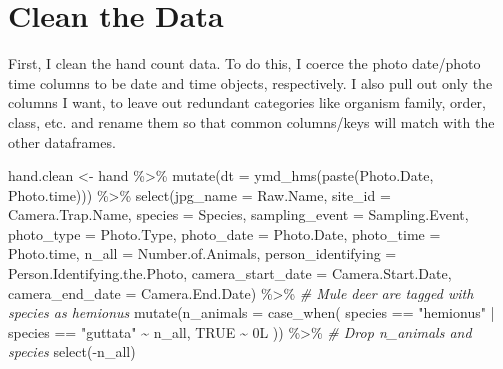 \documentclass[
]{book}
\newenvironment{Shaded}{\begin{snugshade}}{\end{snugshade}}
\newcommand{\AttributeTok}[1]{\textcolor[rgb]{0.77,0.63,0.00}{#1}}
\newcommand{\CommentTok}[1]{\textcolor[rgb]{0.56,0.35,0.01}{\textit{#1}}}
\newcommand{\ConstantTok}[1]{\textcolor[rgb]{0.00,0.00,0.00}{#1}}
\newcommand{\FunctionTok}[1]{\textcolor[rgb]{0.00,0.00,0.00}{#1}}
\newcommand{\NormalTok}[1]{#1}
\newcommand{\OtherTok}[1]{\textcolor[rgb]{0.56,0.35,0.01}{#1}}
\newcommand{\SpecialCharTok}[1]{\textcolor[rgb]{0.00,0.00,0.00}{#1}}
\newcommand{\StringTok}[1]{\textcolor[rgb]{0.31,0.60,0.02}{#1}}
\begin{document}
\hypertarget{clean-the-data}{%
\section{Clean the Data}\label{clean-the-data}}

First, I clean the hand count data. To do this, I coerce the photo date/photo time columns to be date and time objects, respectively. I also pull out only the columns I want, to leave out redundant categories like organism family, order, class, etc. and rename them so that common columns/keys will match with the other dataframes.

\begin{Shaded}
\begin{Highlighting}[]
\NormalTok{hand.clean }\OtherTok{\textless{}{-}}\NormalTok{ hand }\SpecialCharTok{\%\textgreater{}\%} 
  \FunctionTok{mutate}\NormalTok{(}\AttributeTok{dt =} \FunctionTok{ymd\_hms}\NormalTok{(}\FunctionTok{paste}\NormalTok{(Photo.Date, Photo.time))) }\SpecialCharTok{\%\textgreater{}\%} 
  \FunctionTok{select}\NormalTok{(}\AttributeTok{jpg\_name =}\NormalTok{ Raw.Name,}
         \AttributeTok{site\_id =}\NormalTok{ Camera.Trap.Name,}
         \AttributeTok{species =}\NormalTok{ Species,}
         \AttributeTok{sampling\_event =}\NormalTok{ Sampling.Event,}
         \AttributeTok{photo\_type =}\NormalTok{ Photo.Type,}
         \AttributeTok{photo\_date =}\NormalTok{ Photo.Date,}
         \AttributeTok{photo\_time =}\NormalTok{ Photo.time,}
         \AttributeTok{n\_all =}\NormalTok{ Number.of.Animals,}
         \AttributeTok{person\_identifying =}\NormalTok{ Person.Identifying.the.Photo,}
         \AttributeTok{camera\_start\_date =}\NormalTok{ Camera.Start.Date,}
         \AttributeTok{camera\_end\_date =}\NormalTok{ Camera.End.Date) }\SpecialCharTok{\%\textgreater{}\%} 
  \CommentTok{\# Mule deer are tagged with species as \textquotesingle{}hemionus\textquotesingle{}}
  \FunctionTok{mutate}\NormalTok{(}\AttributeTok{n\_animals =} \FunctionTok{case\_when}\NormalTok{(}
\NormalTok{    species }\SpecialCharTok{==} \StringTok{"hemionus"} \SpecialCharTok{|}\NormalTok{ species }\SpecialCharTok{==} \StringTok{"guttata"} \SpecialCharTok{\textasciitilde{}}\NormalTok{ n\_all,}
    \ConstantTok{TRUE} \SpecialCharTok{\textasciitilde{}}\NormalTok{ 0L}
\NormalTok{  )) }\SpecialCharTok{\%\textgreater{}\%} 
  \CommentTok{\# Drop n\_animals and species}
  \FunctionTok{select}\NormalTok{(}\SpecialCharTok{{-}}\NormalTok{n\_all)}
\end{Highlighting}
\end{Shaded}
\end{document}
